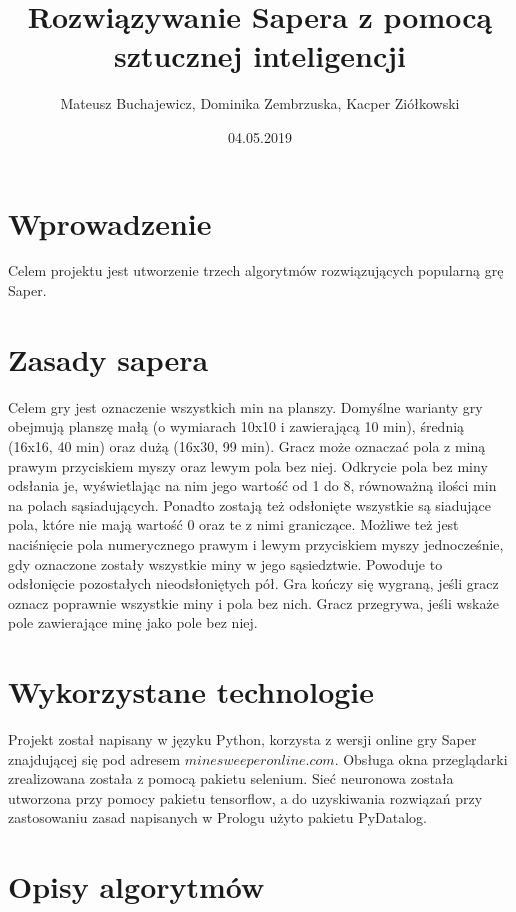 \documentclass[letterpaper,12pt]{article}
\begin{document}
\title{Rozwiązywanie Sapera z pomocą sztucznej inteligencji}
\date{04.05.2019}
\author{ Mateusz Buchajewicz, Dominika Zembrzuska, Kacper Ziółkowski}
\maketitle

\section{Wprowadzenie}
Celem projektu jest utworzenie trzech algorytmów rozwiązujących popularną grę Saper.\\

\section{Zasady sapera}
Celem gry jest oznaczenie wszystkich min na planszy. Domyślne warianty gry obejmują
planszę małą (o wymiarach 10x10 i zawierającą 10 min), średnią (16x16, 40 min)
oraz dużą (16x30, 99 min). Gracz może oznaczać pola z miną prawym przyciskiem
myszy oraz lewym pola bez niej. Odkrycie pola bez miny odsłania je,
wyświetlając na nim jego wartość od 1 do 8, równoważną ilości
min na polach sąsiadujących. Ponadto zostają też odsłonięte wszystkie są
siadujące pola, które nie mają wartość 0 oraz te z nimi graniczące. Możliwe też jest 
naciśnięcie pola numerycznego prawym i lewym przyciskiem myszy jednocześnie, gdy oznaczone
zostały wszystkie miny w jego sąsiedztwie. Powoduje to odsłonięcie pozostałych nieodsłoniętych pół.
Gra kończy się wygraną, jeśli gracz oznacz poprawnie wszystkie miny i pola bez nich.
Gracz przegrywa, jeśli wskaże pole zawierające minę jako pole bez niej.\\

\section{Wykorzystane technologie}
Projekt został napisany w języku Python, korzysta z wersji online gry Saper znajdującej się pod adresem $minesweeperonline.com$. Obsługa okna przeglądarki zrealizowana 
została z pomocą pakietu selenium. Sieć neuronowa została utworzona przy pomocy pakietu tensorflow, a do uzyskiwania rozwiązań przy zastosowaniu zasad napisanych w Prologu
użyto pakietu PyDatalog.
\newpage
\section{Opisy algorytmów}
\end{document}
